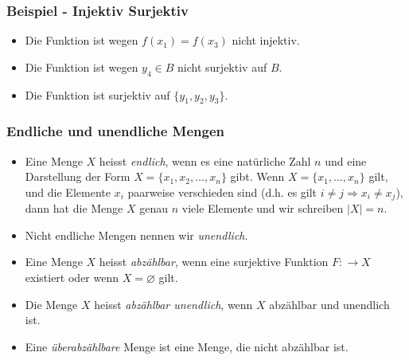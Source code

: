 \subsubsection{Beispiel - Injektiv Surjektiv}%
\label{ssub:beispiel_injektiv_surjektiv}
\begin{minipage}{0.9\linewidth}
	\begin{center}
	\end{center}
	\begin{itemize}
		\item Die Funktion ist wegen $f(x_1)=f(x_3)$ nicht injektiv.
		\item Die Funktion ist wegen $y_4\in B$ nicht surjektiv auf $B$.
		\item Die Funktion ist surjektiv auf $\{y_1,y_2,y_3\}$.
	\end{itemize}
\end{minipage}

\subsubsection{Endliche und unendliche Mengen}%
\label{ssub:endliche_und_unendliche_mengen}
\begin{itemize}
	\item Eine Menge $X$ heisst \textit{endlich}, wenn es eine natürliche Zahl $n$ und eine Darstellung der Form $X=\{x_1,x_2,\dots,x_n\}$ gibt. Wenn $X=\{x_1,\dots,x_n\}$ gilt, und die Elemente $x_i$ paarweise verschieden sind (d.h. es gilt $i\neq j\Rightarrow x_i\neq x_j$), dann hat die Menge $X$ genau $n$ viele Elemente und wir schreiben $|X|=n$.
	\item Nicht endliche Mengen nennen wir \textit{unendlich}.
	\item Eine Menge $X$ heisst \textit{abzählbar}, wenn eine surjektive Funktion $F:\to X$ existiert oder wenn $X=\varnothing$ gilt.
	\item Die Menge $X$ heisst \textit{abzählbar unendlich}, wenn $X$ abzählbar und unendlich ist.
	\item Eine \textit{überabzählbare} Menge ist eine Menge, die nicht abzählbar ist.
\end{itemize}

